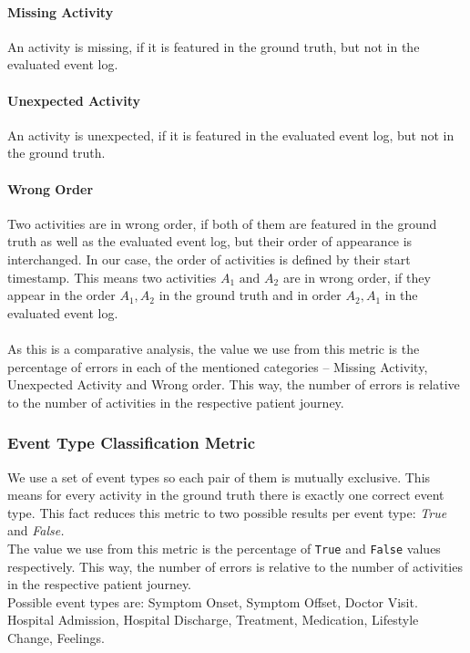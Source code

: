 \paragraph{Missing Activity} An activity is missing, if it is featured in the ground truth, but not in the evaluated event log. 
\paragraph{Unexpected Activity} An activity is unexpected, if it is featured in the evaluated event log, but not in the ground truth.
\paragraph{Wrong Order} Two activities are in wrong order, if both of them are featured in the ground truth as well as the evaluated event log, but their order of appearance is interchanged. In our case, the order of activities is defined by their start timestamp. This means two activities $A_1 \text{ and } A_2$ are in wrong order, if they appear in the order $A_1,A_2$ in the ground truth and in order $A_2, A_1$ in the evaluated event log.\\\\
As this is a comparative analysis, the value we use from this metric is the percentage of errors in each of the mentioned categories – Missing Activity, Unexpected Activity and Wrong order. This way, the number of errors is relative to the number of activities in the respective patient journey.

\subsubsection{Event Type Classification Metric}\label{sec:eventtype_metric}
We use a set of event types so each pair of them is mutually exclusive. This means for every activity in the ground truth there is exactly one correct event type. This fact reduces this metric to two possible results per event type: \emph{True} and \emph{False.}\\
The value we use from this metric is the percentage of \verb|True| and \verb|False| values respectively. This way, the number of errors is relative to the number of activities in the respective patient journey.\\
Possible event types are: Symptom Onset, Symptom Offset, Doctor Visit. Hospital Admission, Hospital Discharge, Treatment, Medication, Lifestyle Change, Feelings.

